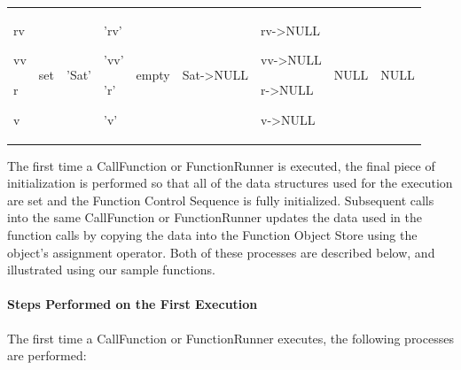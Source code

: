 \begin{center}
\begin{supertabular}{|p{0.5in}|p{0.5in}|p{0.4in}|p{0.4in}|p{0.5in}|p{0.68in}|p{0.67in}|p{0.5in}|
p{0.5in}|}
\begin{small}
rv

vv

r

v
\end{small} &
\begin{small}
set
\end{small} &
\begin{small}
'Sat'
\end{small} &
\begin{small}
'rv'

'vv'

'r'

'v'
\end{small} &
\begin{small}
empty
\end{small} &
\begin{small}
Sat->NULL
\end{small} &
\begin{small}
rv->NULL

vv->NULL

r->NULL

v->NULL
\end{small} &
\begin{small}
NULL
\end{small} &
\begin{small}
NULL
\end{small} \\
\end{supertabular}
\end{center}

The first time a CallFunction or FunctionRunner is executed, the final piece of initialization is
performed so that all of the data structures used for the execution are set and the Function Control
Sequence is fully initialized.  Subsequent calls into the same CallFunction or FunctionRunner
updates the data used in the function calls by copying the data into the Function Object Store using
the object's assignment operator.  Both of these processes are described below, and illustrated
using our sample functions.

\paragraph{Steps Performed on the First Execution} The first time a CallFunction or FunctionRunner
executes, the following processes are performed:

